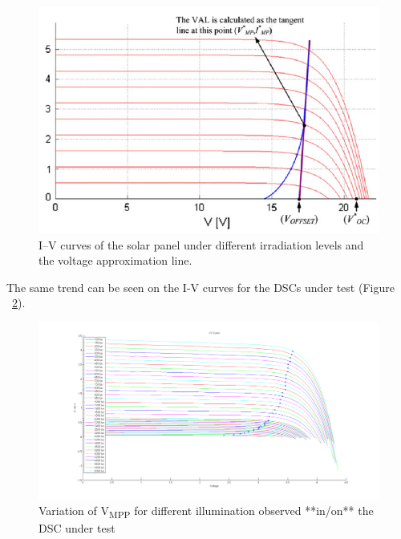  \begin{figure}[H]
  \begin{center}
  \includegraphics[width=\textwidth]{images/IVCurve_lui}
  \caption{I–V curves of the solar panel under different irradiation levels and the voltage approximation line. \cite{liu2011fast} }
  \label{fig:Lui_IV_1}
  \end{center}
  \end{figure}
  
  The same trend can be seen on the I-V curves for the \ac{DSCs} under test (Figure ~\ref{fig:vmmp_lux50_5000}).
   \begin{figure}[H]
    \begin{center}
    \includegraphics[width=\textwidth]{images/IV_50-500}
    \caption{Variation of V\textsubscript{MPP} for different illumination observed **in/on** the DSC under test }
    \label{fig:vmmp_lux50_5000}
    \end{center}
    \end{figure}
  

